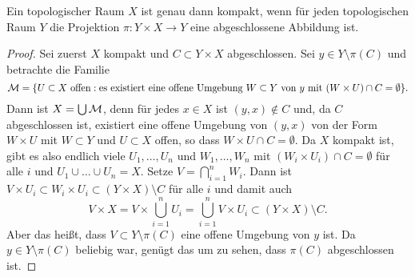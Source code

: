 \begin{theorem}\label{thm:compactness-properness}
  Ein topologischer Raum $X$ ist genau dann kompakt, wenn für jeden topologischen Raum $Y$ die Projektion $\pi\colon Y\times X\to Y$ eine abgeschlossene Abbildung ist.
\end{theorem}
\begin{proof}
  Sei zuerst $X$ kompakt und $C\subset Y\times X$ abgeschlossen. Sei $y\in Y\setminus\pi(C)$ und betrachte die Familie
  \[
    \cal M = \{ \text{$U\subset X$ offen} : \text{es existiert eine offene Umgebung $W\subset Y$ von $y$ mit $(W\times U)\cap C = \emptyset$}\}.
  \]
  Dann ist $X = \bigcup\cal M$, denn für jedes $x\in X$ ist $(y, x)\not\in C$ und, da $C$ abgeschlossen ist, existiert eine offene Umgebung von $(y,x)$ von der Form $W\times U$ mit $W\subset Y$ und $U\subset X$ offen, so dass $W\times U\cap C=\emptyset$. Da $X$ kompakt ist, gibt es also endlich viele $U_1,\dots, U_n$ und $W_1,\dots, W_n$ mit $(W_i\times U_i)\cap C = \emptyset$ für alle $i$ und $U_1\cup\dots\cup U_n = X$. Setze $V = \bigcap_{i=1}^n W_i$. Dann ist $V\times U_i\subset W_i\times U_i\subset (Y\times X)\setminus C$ für alle $i$ und damit auch
  \[
    V\times X = V\times\bigcup_{i=1}^n U_i = \bigcup_{i=1}^n V\times U_i\subset (Y\times X)\setminus C.
  \]
  Aber das heißt, dass $V\subset Y\setminus\pi(C)$ eine offene Umgebung von $y$ ist. Da $y\in Y\setminus\pi(C)$ beliebig war, genügt das um zu sehen, dass $\pi(C)$ abgeschlossen ist.


\end{proof}
